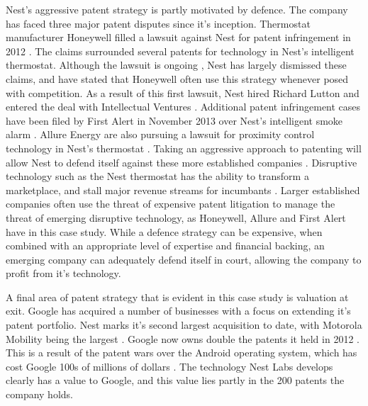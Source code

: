 Nest's aggressive patent strategy is partly motivated by defence. 
The company has faced three major patent disputes since it's inception.
Thermostat manufacturer Honeywell filled a lawsuit against Nest for patent infringement in 2012 \cite{NestHoneywellGig, NestHoneywellVerge, NestHoneywell}.
The claims surrounded several patents for technology in Nest's intelligent thermostat.
Although the lawsuit is ongoing \cite{NestFirstVerge}, Nest has largely dismissed these claims, and have stated that Honeywell often use this strategy whenever posed with competition.
As a result of this first lawsuit, Nest hired Richard Lutton and entered the deal with Intellectual Ventures \cite{NestFirstGig}.
Additional patent infringement cases have been filed by First Alert in November 2013 over Nest's intelligent smoke alarm \cite{NestFirstVerge, NestFirstGig}.
Allure Energy are also pursuing a lawsuit for proximity control technology in Nest's thermostat \cite{NestAllureCnet}.
Taking an aggressive approach to patenting will allow Nest to defend itself against these more established companies \cite{NestAllureCnet}.
Disruptive technology such as the Nest thermostat has the ability to transform a marketplace, and stall major revenue streams for incumbants \cite{NestCoLabs}. 
Larger established companies often use the threat of expensive patent litigation to manage the threat of emerging disruptive technology, as Honeywell, Allure and First Alert have in this case study.
While a defence strategy can be expensive, when combined with an appropriate level of expertise and financial backing, an emerging company can adequately defend itself in court, allowing the company to profit from it's technology.

A final area of patent strategy that is evident in this case study is valuation at exit.
Google has acquired a number of businesses with a focus on extending it's patent portfolio.
Nest marks it's second largest acquisition to date, with Motorola Mobility being the largest \cite{NestReuters}.
Google now owns double the patents it held in 2012 \cite{NestCoLabs}.
This is a result of the patent wars over the Android operating system, which has cost Google 100s of millions of dollars \cite{NestCoLabs}.
The technology Nest Labs develops clearly has a value to Google, and this value lies partly in the 200 patents the company holds.




